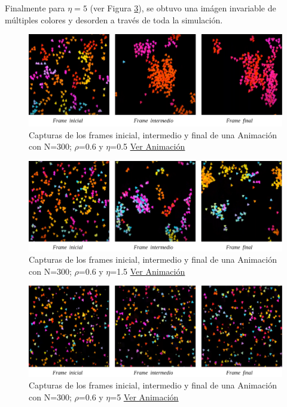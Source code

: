 \documentclass[12pt, a4paper]{report}
\begin{document}
Finalmente para $\eta = 5$ (ver Figura \ref{fig:noise_N300_d06_n5}), se obtuvo una imágen invariable de múltiples colores y desorden a través de toda la simulación.

\begin{figure}[h]
\includegraphics[scale=0.4]{noise_N300_d06_n05.png}
\centering 
\caption{Capturas de los frames inicial, intermedio y final de una Animación con N=300; $\rho$=0.6 y $\eta$=0.5 \href{https://www.youtube.com/watch?v=hD-HLrDGDrI}{\underline{Ver Animación}}} 
\label{fig:noise_N300_d06_n05}
\end{figure}

\begin{figure}[h]
\includegraphics[scale=0.4]{noise_N300_d06_n1_5.png}
\centering 
\caption{Capturas de los frames inicial, intermedio y final de una Animación con N=300; $\rho$=0.6 y $\eta$=1.5 \href{https://www.youtube.com/watch?v=pNaZWqdfaxg}{\underline{Ver Animación}}} 
\label{fig:noise_N300_d06_n1_5}
\end{figure}

\pagebreak
\begin{figure}[h]
\includegraphics[scale=0.4]{noise_N300_d06_n5.png}
\centering 
\caption{Capturas de los frames inicial, intermedio y final de una Animación con N=300; $\rho$=0.6 y $\eta$=5 \href{https://www.youtube.com/watch?v=KpLdzP7WLP8}{\underline{Ver Animación}}}
\label{fig:noise_N300_d06_n5}
\end{figure}
\end{document}
